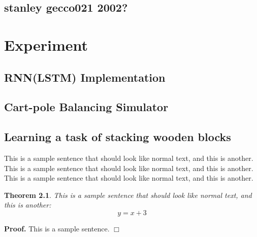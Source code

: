 \documentclass[officiallayout]{tktla}
\newtheorem{theorem}{Theorem}[chapter]
\newenvironment{proof}{\noindent\textbf{Proof.} }{$\Box$}
\begin{document}
\section{stanley gecco021 2002?}
\chapter{Experiment}
\section{RNN(LSTM) Implementation}
\section{Cart-pole Balancing Simulator}
\section{Learning a task of stacking wooden blocks}

This is a sample sentence that should look like normal text, and this
is another. This is a sample sentence that should look like normal
text, and this is another. This is a sample sentence that should look
like normal text, and this is another.


\begin{theorem}
This is a sample sentence that should look like normal text,
and this is another:
\[ y = x+3 \]
\end{theorem}

\begin{proof}
This is a sample sentence.
\end{proof}



\end{document}
